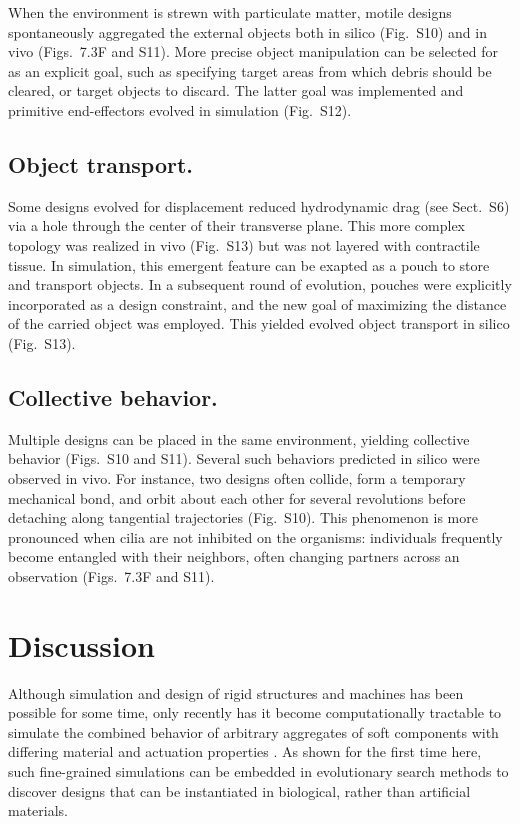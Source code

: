 When the environment is strewn with particulate matter, motile designs spontaneously aggregated the external objects both in silico (Fig.~S10) and in vivo (Figs.~7.3F and S11). 
More precise object manipulation can be selected for as an explicit goal, such as specifying target areas from which debris should be cleared, or target objects to discard. 
The latter goal was implemented and primitive end-effectors evolved in simulation (Fig.~S12).

\subsection*{Object transport.} 

Some designs evolved for displacement reduced hydrodynamic drag (see Sect.~S6) via a hole through the center of their transverse plane. 
This more complex topology was realized in vivo (Fig.~S13) but was not layered with contractile tissue. 
In simulation, this emergent feature can be exapted as a pouch to store and transport objects. 
In a subsequent round of evolution, pouches were explicitly incorporated as a design constraint, and the new goal of maximizing the distance of the carried object was employed. This yielded evolved object transport in silico (Fig.~S13).

\subsection*{Collective behavior.}  

Multiple designs can be placed in the same environment, yielding collective behavior 
\cite{werfel2014designing} 
(Figs.~S10 and S11). 
Several such behaviors predicted in silico were observed in vivo. 
For instance, two designs often collide, form a temporary mechanical bond, and orbit about each other for several revolutions before detaching along tangential trajectories (Fig.~S10). 
This phenomenon is more pronounced when cilia are not inhibited on the organisms: individuals frequently become entangled with their neighbors, often changing partners across an observation (Figs.~7.3F and S11).

\section{Discussion}

Although simulation and design of rigid structures and machines has been possible for some time, only recently has it become computationally tractable to simulate the combined behavior of arbitrary aggregates of soft components with differing material and actuation properties \cite{hiller2014dynamic}.
As shown for the first time here, such fine-grained simulations can be embedded in evolutionary search methods to discover designs that can be instantiated in biological, rather than artificial materials. 

